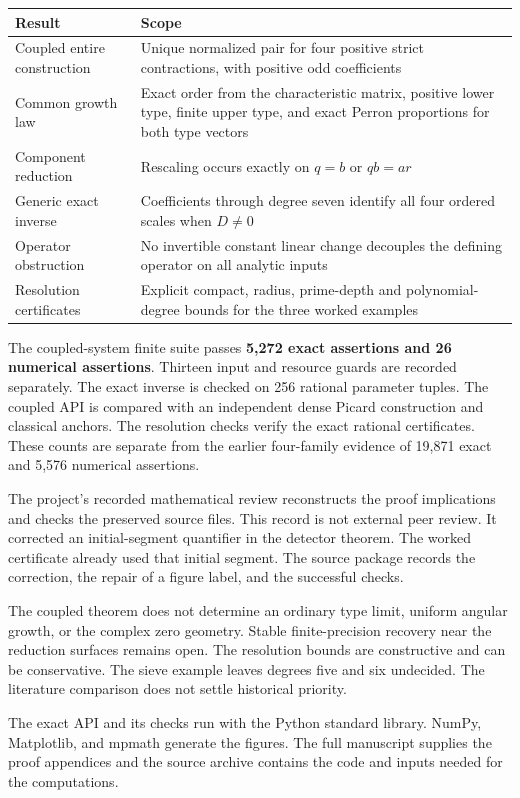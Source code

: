 \renewcommand{\arraystretch}{1.28}
\begin{tabular}{@{}>{\raggedright\arraybackslash}p{.28\linewidth}>{\raggedright\arraybackslash}p{.65\linewidth}@{}}
\toprule
Result & Scope\\\midrule
Coupled entire construction & Unique normalized pair for four positive strict contractions, with positive odd coefficients\\
Common growth law & Exact order from the characteristic matrix, positive lower type, finite upper type, and exact Perron proportions for both type vectors\\
Component reduction & Rescaling occurs exactly on $q=b$ or $qb=ar$\\
Generic exact inverse & Coefficients through degree seven identify all four ordered scales when $D\ne0$\\
Operator obstruction & No invertible constant linear change decouples the defining operator on all analytic inputs\\
Resolution certificates & Explicit compact, radius, prime-depth and polynomial-degree bounds for the three worked examples\\
\bottomrule
\end{tabular}

The coupled-system finite suite passes \textbf{5,272 exact assertions and 26 numerical
assertions}. Thirteen input and resource guards are recorded separately.
The exact inverse is checked on 256 rational parameter tuples. The coupled
API is compared with an independent dense Picard construction and classical
anchors. The resolution checks verify the exact rational certificates.
These counts are separate from the earlier four-family evidence of 19,871 exact
and 5,576 numerical assertions.

The project's recorded mathematical review reconstructs the proof implications
and checks the preserved source files. This record is not external peer review. It corrected an initial-segment quantifier in the
detector theorem. The worked certificate already used that initial segment.
The source package records the correction, the repair of a figure label, and the successful checks.

The coupled theorem does not determine an ordinary type limit, uniform angular
growth, or the complex zero geometry. Stable finite-precision recovery near the
reduction surfaces remains open. The resolution bounds are constructive and
can be conservative. The sieve example leaves degrees five and six undecided.
The literature comparison does not settle historical priority.

The exact API and its checks run with the Python standard library. NumPy, Matplotlib, and
mpmath generate the figures. The full manuscript supplies the proof
appendices and the source archive contains the code and inputs needed for the computations.
